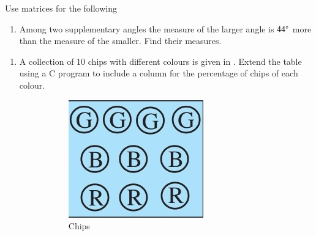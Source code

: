 Use matrices for the following
\begin{enumerate}[label=\thesubsection.\arabic*, ref=\thesubsection.\theenumi,resume*]
\item Among two supplementary angles the measure of the larger angle is $44\degree$  more than the measure of the smaller. Find their measures.
\end{enumerate}
\begin{enumerate}[label=\thesubsection.\arabic*, ref=\thesubsection.\theenumi,resume*]
\item 
	A collection of 10 chips with different colours is given in 
.
Extend the table using a C program
to include a column for the percentage of chips of each colour.
\begin{figure}[H]
  \centering
  \begin{subfigure}{0.4\textwidth}
    \includegraphics[width=\textwidth]{figs/percent2.jpg}
    \caption{Chips}
  \end{subfigure}
  \hfill
  \begin{subfigure}{0.4\textwidth}

\end{subfigure}
\end{figure}
\end{enumerate}
